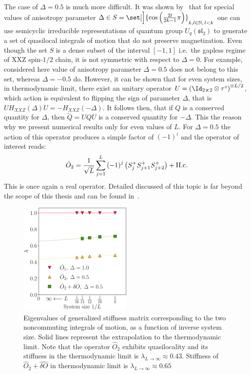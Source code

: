 The case of \(\Delta=0.5\) is much more difficult. It was shown by~\textcite{zadnik2016} that for 
special values of anisotropy parameter \(\Delta \in S = \set[\Big]{\cos\left(\frac{2l}{2k-1}
\pi\right)}_{k,l\in \NN,\, l<k}\) one can use semicyclic irreducible representations
of quantum group \(U_q(\mathfrak{sl}_2)\) to generate a set of quasilocal integrals of 
motion that do not preserve magnetization. Even though the set \(S\) is a dense subset
of the interval \([-1,1]\) i.e.\ the gapless regime of XXZ spin-\(1/2\) chain, it is not
symmetric with respect to \(\Delta=0\). For example, considered here value of anisotropy parameter
\(\Delta=0.5\) does not belong to this set, whereas \(\Delta=-0.5\) do. However, it can be shown
that for even system sizes, in thermodynamic limit, there exist an unitary operator 
\(U = \left(\Id_{2\cross 2}\otimes \tau^z\right)^{\otimes L/2}\), which action is equivalent to flipping the sign 
of parameter \(\Delta\), that is \(UH_{XXZ}(\Delta)U = -H_{XXZ}(-\Delta)\). It follows then,
that if \(Q\) is a conserved quantity for \(\Delta\), then \(\tilde{Q} = UQU\) is a conserved
quantity for \(-\Delta\). This the reason why we present numerical results only for even 
values of \(L\). For \(\Delta=0.5\) the action
of this operator produces a simple factor of \((-1)^i\) and the operator of interest reads:
\begin{equation}
  \hat{O}_{2} =\frac{1}{\sqrt{L}} \sum_{j=1}^{L} {(-1)}^j \left( S^{+}_{j}S^{+}_{j+1}S^{+}_{j+2}\right) + \text{H.c.}
  \label{eq:delta 0.5}
\end{equation}  
This is once again a real operator. Detailed discussed of this topic is far beyond the scope of this thesis
and can be found in~\autocite{Ilievski2016a,zadnik2016,Prosen2014c}.

\begin{figure}[htbp]
  \centering
  \includegraphics[width=0.5\textwidth]{Figures/nocomm_int.pdf}
  \caption{Eigenvalues of generalized stiffness matrix corresponding to the two noncommuting
    integrals of motion, as a function of inverse system size. Solid lines represent the extrapolation
    to the thermodynamic limit. Note that the operator \(\hat{O}_2\) exhibits quasilocality
    and its stiffness in the thermodynamic limit is \(\lambda_{L\to\infty} \approx
    0.43\). Stiffness of \(\hat{O}_2 + \hat{\delta O}\) in thermodynamic limit is
    \(\lambda_{L\to\infty} \approx 0.65\)}
  \label{fig: noncommuting integrable}
\end{figure}

